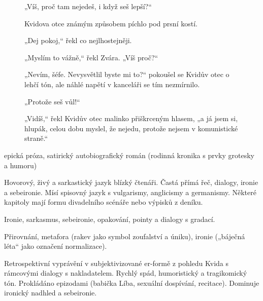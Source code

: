 \documentclass[FGBook.tex]{subfiles}
\begin{document}

\noindent\begin{figure}\footnotesize
{}
\setlength{\parindent}{3pt}
„Víš, proč tam nejedeš, i když seš lepší?“

Kvidova otce známým způsobem píchlo pod prsní kostí.

„Dej pokoj,“ řekl co nejlhostejněji.

„Myslím to vážně,“ řekl Zvára. „Víš proč?“

„Nevím, šéfe. Nevysvětlil byste mi to?“ pokoušel se Kvidův otec o lehčí tón, ale náhlé napětí v kanceláři se tím nezmírnilo.

„Protože seš vůl!“

„Vidíš,“ řekl Kvidův otec malinko přiškrceným hlasem, „a já jsem si, hlupák, celou dobu myslel, že nejedu, protože nejsem v komunistické straně.“
\end{figure}


\noindent epická próza, satirický autobiografický román (rodinná kronika s prvky grotesky a humoru)

\noindent Hovorový, živý a sarkastický jazyk blízký čtenáři. Častá přímá řeč, dialogy, ironie a sebeironie. Mísí spisovný jazyk s vulgarismy, anglicismy a germanismy. Některé kapitoly mají formu divadelního scénáře nebo výpisků z deníku.

\noindent Ironie, sarkasmus, sebeironie, opakování, pointy a dialogy s gradací.

\noindent Přirovnání, metafora (rakev jako symbol zoufalství a úniku), ironie („báječná léta“ jako označení normalizace).

\noindent Retrospektivní vyprávění v subjektivizované er-formě z pohledu Kvida s rámcovými dialogy s nakladatelem. Rychlý spád, humoristický a tragikomický tón. Prokládáno epizodami (babička Líba, sexuální dospívání, recitace). Dominuje ironický nadhled a sebeironie.
\end{document}
